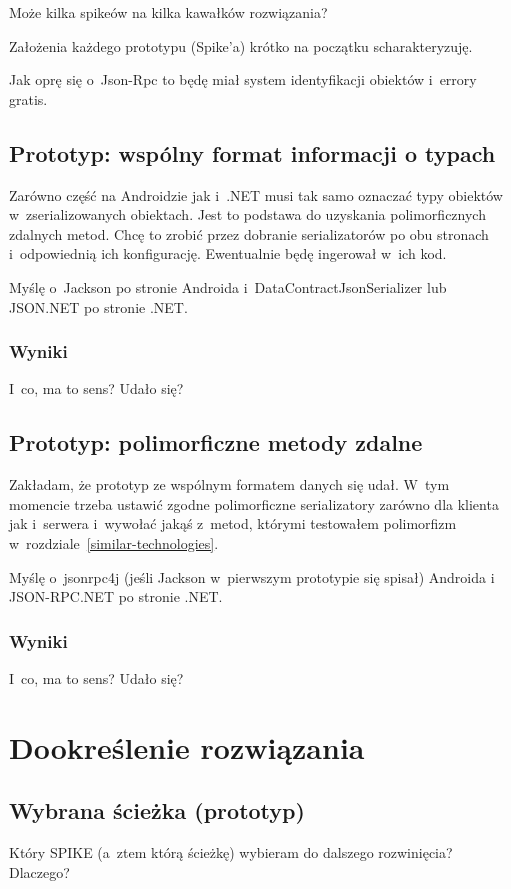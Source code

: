 Może kilka spikeów na kilka kawałków rozwiązania?

Założenia każdego prototypu (Spike'a) krótko na początku scharakteryzuję.

Jak oprę się o~Json-Rpc to będę miał system identyfikacji obiektów i~errory gratis.

\subsection{Prototyp: wspólny format informacji o typach}
Zarówno część na Androidzie jak i~.NET musi tak samo oznaczać typy obiektów w~zserializowanych obiektach.
Jest to podstawa do uzyskania polimorficznych zdalnych metod.
Chcę to zrobić przez dobranie serializatorów po obu stronach i~odpowiednią ich konfigurację. Ewentualnie będę ingerował w~ich kod.

Myślę o~Jackson po stronie Androida i~DataContractJsonSerializer lub JSON.NET po stronie .NET\@.

\subsubsection{Wyniki}
I~co, ma to sens? Udało się?


\subsection{Prototyp: polimorficzne metody zdalne}
Zakładam, że prototyp ze wspólnym formatem danych się udał.
W~tym momencie trzeba ustawić zgodne polimorficzne serializatory zarówno dla klienta jak i~serwera i~wywołać jakąś z~metod, którymi testowałem polimorfizm w~rozdziale~\ref{similar-technologies}.

Myślę o~jsonrpc4j (jeśli Jackson w~pierwszym prototypie się spisał) Androida i JSON-RPC.NET po stronie .NET\@.

\subsubsection{Wyniki}
I~co, ma to sens? Udało się?



\section{Dookreślenie rozwiązania}
\subsection{Wybrana ścieżka (prototyp)}
Który SPIKE (a~ztem którą ścieżkę) wybieram do dalszego rozwinięcia?
Dlaczego?


